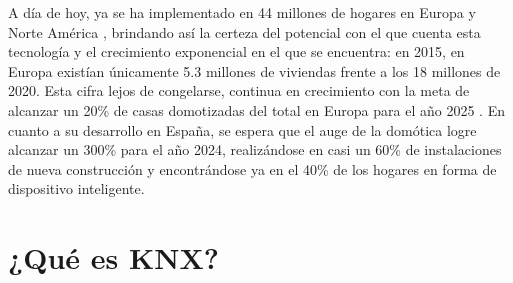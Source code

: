 A día de hoy, ya se ha implementado en 44 millones de hogares en Europa y Norte América \cite{HT:2014}, brindando así la certeza del potencial con el que cuenta esta tecnología y el crecimiento exponencial en el que se encuentra: en 2015, en Europa existían únicamente 5.3 millones de viviendas frente a los 18 millones de 2020. Esta cifra lejos de congelarse, continua en crecimiento con la meta de alcanzar un 20\% de casas domotizadas del total en Europa para el año 2025 \cite{Berg:2020}. En cuanto a su desarrollo en España, se espera que el auge de la domótica logre alcanzar un 300\% para el año 2024, realizándose en casi un 60\% de instalaciones de nueva construcción \cite{Portal:2020} y encontrándose ya en el 40\% de los hogares en forma de dispositivo inteligente.

\newpage
\section{¿Qué es KNX?}

